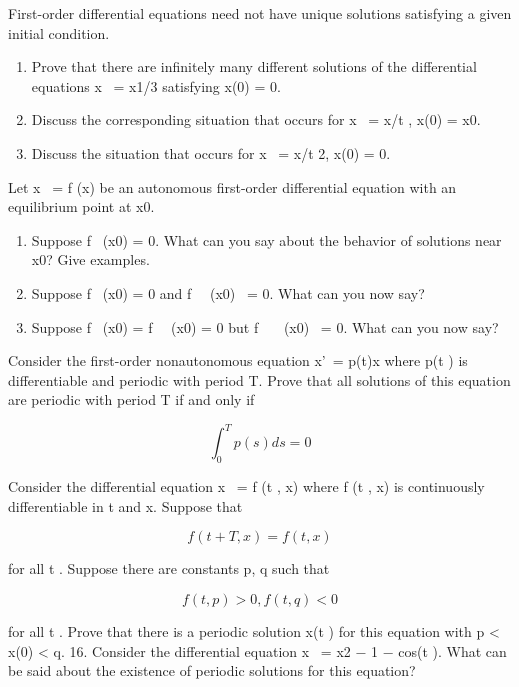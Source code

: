 \documentclass{article}
\begin{document}

\item First-order differential equations need not have unique solutions satisfying
a given initial condition.

\begin{enumerate}
\item Prove that there are infinitely many different solutions of the
differential equations x  = x1/3 satisfying x(0) = 0.
\item Discuss the corresponding situation that occurs for x  = x/t ,
x(0) = x0.
\item Discuss the situation that occurs for x  = x/t 2, x(0) = 0.
\end{enumerate}

\item Let x  = f (x) be an autonomous first-order differential equation with
an equilibrium point at x0.

\begin{enumerate}
\item Suppose f  (x0) = 0. What can you say about the behavior of
solutions near x0? Give examples.
\item Suppose f  (x0) = 0 and f   (x0)  = 0. What can you now say?
\item Suppose f  (x0) = f   (x0) = 0 but f    (x0)  = 0. What can you now
say?
\end{enumerate}

\item Consider the first-order nonautonomous equation x' = p(t)x where
p(t ) is differentiable and periodic with period T. Prove that all solutions
of this equation are periodic with period T if and only if

\[
\int_0^T p(s) ds = 0
\]

\item Consider the differential equation x  = f (t , x) where f (t , x) is continuously
differentiable in t and x. Suppose that

\[
f (t + T, x) = f (t , x)
\]

for all t . Suppose there are constants p, q such that

\[
f (t , p) > 0, f (t , q) < 0
\]

for all t . Prove that there is a periodic solution x(t ) for this equation with
p < x(0) < q.
16. Consider the differential equation x  = x2 − 1 − cos(t ). What can be
said about the existence of periodic solutions for this equation?
\end{document}
